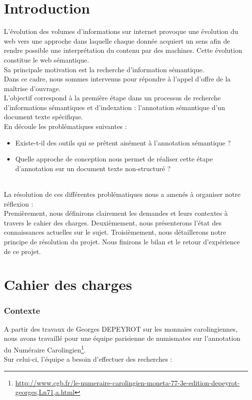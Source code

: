 \documentclass[a4paper, 11pt]{report}
\begin{document}
\part{Introduction}
L'évolution des volumes d'informations sur internet provoque une évolution du web vers une approche dans laquelle chaque donnée acquiert un sens afin de rendre possible une interprétation du contenu par des machines. Cette évolution constitue le web sémantique.\\
Sa principale motivation  est la recherche d’information sémantique.\\

Dans ce cadre, nous sommes intervenus pour répondre à l'appel d'offre de la maîtrise d'ouvrage. \\
L'objectif correspond à la première étape dans un processus de recherche d'informations sémantiques et d'indexation : l'annotation sémantique d'un document texte spécifique.\\

En découle les problématiques suivantes :
\begin{itemize}
\item Existe-t-il des outils qui se prêtent aisément à l'annotation sémantique ?
\item Quelle approche de conception nous permet de réaliser cette étape d'annotation sur un document texte non-structuré ?
\end{itemize}
	~\\
	
La résolution de ces différentes problématiques nous a amenés à organiser notre réflexion :\\
Premièrement, nous définirons clairement les demandes et leurs contextes à travers le cahier des charges. Deuxièmement, nous présenterons l'état des connaissances actuelles sur le sujet. Troisièmement, nous détaillerons notre principe de résolution du projet. Nous finirons le bilan et le retour d’expérience de ce projet.
\part{Cahier des charges}
	\section{Contexte}

A partir des travaux de Georges DEPEYROT sur les monnaies carolingiennes, nous avons travaillé pour une équipe parisienne de numismates sur l'annotation du Numéraire Carolingien\footnote{\url{http://www.cgb.fr/le-numeraire-carolingien-moneta-77-3e-edition-depeyrot-georges,Ln71,a.html}}.\\
Sur celui-ci, l'équipe a besoin d'effectuer des recherches :
\end{document}
